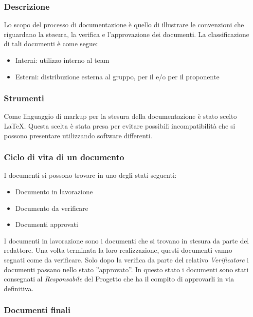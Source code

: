 \subsubsection{Descrizione }
Lo scopo del processo di documentazione è quello di illustrare le
convenzioni che riguardano la stesura, la verifica e l'approvazione
dei documenti. La classificazione di tali documenti è come segue: 
\begin{itemize} 
\item Interni: utilizzo interno al team
\item Esterni: distribuzione esterna al gruppo, per il  e/o per il proponente
\end{itemize}

\subsubsection{Strumenti}

Come linguaggio di markup per la stesura della documentazione  è stato
scelto \LaTeX. Questa scelta è stata presa per evitare possibili
incompatibilità che si possono presentare utilizzando software
differenti. 

\subsubsection{Ciclo di vita di un documento}

I documenti si possono trovare in uno degli stati seguenti:
\begin{itemize}
\item Documento in lavorazione
\item Documento da verificare
\item Documenti approvati
\end{itemize}

I documenti in lavorazione sono i documenti che si trovano in stesura
da parte del redattore. Una volta terminata la loro realizzazione,
questi documenti vanno segnati come da verificare.
Solo dopo la verifica da parte 
del relativo  \emph{Verificatore}  i documenti passano nello stato 
''approvato''. In questo stato i documenti sono stati consegnati al
 \emph{Responsabile}  del Progetto che ha il compito di approvarli in via
definitiva. 

\subsubsection{Documenti finali}

